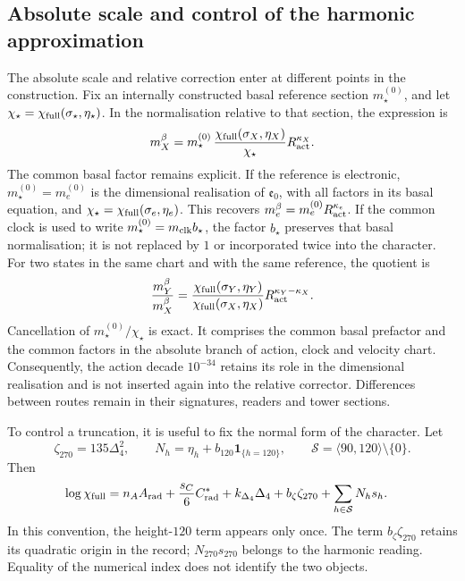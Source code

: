 \subsection{Absolute scale and control of the harmonic approximation}
\label{subsec:vi-precision-torres}

The absolute scale and relative correction enter at different
points in the construction. Fix an internally constructed
basal reference section \(m_\star^{(0)}\), and let
\(\chi_\star=\chi_{\rm full}(\sigma_\star,\eta_\star)\).
In the normalisation relative to that section, the expression is
\[
 m_X^\beta=m_\star^{(0)}\,
 \frac{\chi_{\rm full}(\sigma_X,\eta_X)}{\chi_\star}
 R_{\rm act}^{\kappa_X}.
\]
The common basal factor remains explicit. If the reference is electronic,
\(m_\star^{(0)}=m_e^{(0)}\) is the dimensional realisation of
\(\mathfrak e_0\), with all factors in its basal equation, and
\(\chi_\star=\chi_{\rm full}(\sigma_e,\eta_e)\). This recovers
\(m_e^\beta=m_e^{(0)}R_{\rm act}^{\kappa_e}\). If the common
clock is used to write \(m_\star^{(0)}=m_{\rm clk}b_\star\), the
factor \(b_\star\) preserves that basal normalisation; it is not replaced
by \(1\) or incorporated twice into the character. For two states
in the same chart and with the same reference, the quotient is
\[
 \frac{m_Y^\beta}{m_X^\beta}
 =\frac{\chi_{\rm full}(\sigma_Y,\eta_Y)}
        {\chi_{\rm full}(\sigma_X,\eta_X)}
     R_{\rm act}^{\kappa_Y-\kappa_X}.
\]
Cancellation of \(m_\star^{(0)}/\chi_\star\) is exact. It comprises
the common basal prefactor and the common factors in the absolute branch of
action, clock and velocity chart. Consequently,
the action decade \(10^{-34}\) retains its role in
the dimensional realisation and is not inserted again into the relative
corrector. Differences between routes remain in their signatures, readers
and tower sections.

To control a truncation, it is useful to fix the normal form of the character.
Let
\[
 \zeta_{270}=135\Delta_4^2,\qquad
 N_h=\eta_h+b_{120}\mathbf 1_{\{h=120\}},\qquad
 \mathcal S=\langle90,120\rangle\setminus\{0\}.
\]
Then
\[
\begin{split}
 \log\chi_{\rm full}
 ={}&n_AA_{\rm rad}+\frac{s_C}{6}C^*_{\rm rad}
       +k_{\Delta_4}\Delta_4+b_\zeta\zeta_{270}
       +\sum_{h\in\mathcal S}N_hs_h .
\end{split}
\]
In this convention, the height-\(120\) term appears only once.
The term \(b_\zeta\zeta_{270}\) retains its quadratic origin in the
record; \(N_{270}s_{270}\) belongs to the harmonic reading. Equality
of the numerical index does not identify the two objects.

